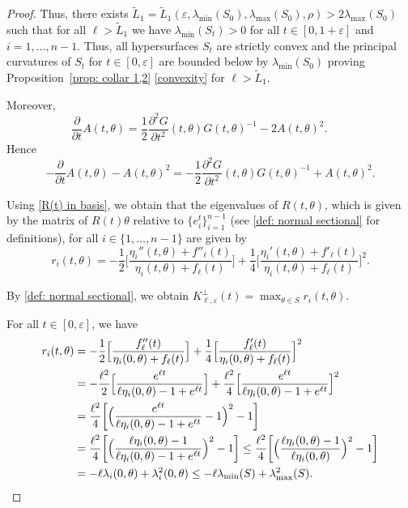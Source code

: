 \documentclass[10pt]{amsart}
\theoremstyle{definition}
\let\eps\varepsilon
\renewcommand{\>}{{\rangle}}
\newcommand{\<}{{\langle}}
\begin{document}
\begin{proof}
Thus, there exists $\tilde L_1=\tilde L_1(\eps, \lambda_{\min}(S_0), \lambda_{\max}(S_0), \rho)>2\lambda_{\max}(S_0)$ such that for all $\ell>\tilde L_1$ we have $\lambda_{\min}(S_t)>0$ for all $t\in[0,1+\eps]$ and $i=1,\ldots, n-1$. Thus, all hypersurfaces $S_t$ are strictly convex and the principal curvatures of $S_t$ for $t\in[0,\eps]$ are bounded below by $\lambda_{\min}(S_0)$ proving Proposition~\ref{prop: collar 1,2} \eqref{convexity} for $\ell> \tilde L_1$.

Moreover,
\[
\frac{\partial}{\partial t}A(t,\theta) = \frac{1}{2}\frac{\partial^2 G}{\partial t^2}(t,\theta)G(t,\theta)^{-1}-2A(t,\theta)^2. \qquad \text{}\nonumber
\]
Hence
\begin{equation}
-\frac{\partial}{\partial t}A(t,\theta)-A(t,\theta)^2 = -\frac{1}{2}\frac{\partial^2 G}{\partial t^2}(t,\theta)G(t,\theta)^{-1}+A(t,\theta)^2.\label{R(t) in basis}
\end{equation}

Using \eqref{R(t) in basis}, we obtain that the eigenvalues of $R(t,\theta)$, which is given by the matrix of $R(t)\theta$ relative to $\{e_i^t\}_{i=1}^{n-1}$ (see \eqref{def: normal sectional} for definitions), for all $i\in\{1,\ldots, n-1\}$ are given by
\begin{equation}\label{eigenvalues of R(t)}
r_i(t,\theta)=-\frac{1}{2}\biggl[\frac{\eta_i''(t,\theta)+f''_\ell(t)}{\eta_i(t,\theta)+f_\ell(t)}\biggr]+\frac{1}{4}\biggl[\frac{\eta_i'(t,\theta)+f'_\ell(t)}{\eta_i(t,\theta)+f_\ell(t)}\biggr]^2.
\end{equation}

By \eqref{def: normal sectional}, we obtain $K^\perp_{\ell,\eps}(t)=\max_{\theta\in S} r_i(t,\theta)$.

For all $t\in[0,\eps]$, we have
\begin{align*}
r_i(t,\theta) &= -\frac{1}{2}\Bigl[\frac{f''_\ell(t)}{\eta_i(0,\theta)+f_\ell(t)}\Bigr]+\frac{1}{4}\Bigl[\frac{f'_\ell(t)}{\eta_i(0,\theta)+f_\ell(t)}\Bigr]^2\\
&=-\frac{\ell^2}{2}\Bigl[\frac{e^{\ell t}}{\ell\eta_i(0,\theta)-1+e^{\ell t}}\Bigr]+\frac{\ell^2}{4}\Bigl[\frac{e^{\ell t}}{\ell\eta_i(0,\theta)-1+e^{\ell t}}\Bigr]^2\\
&=\frac{\ell^2}{4}\biggl[\Bigl(\frac{e^{\ell t}}{\ell\eta_i(0,\theta)-1+e^{\ell t}}-1\Bigr)^2-1\biggr]\\
&=\frac{\ell^2}{4}\biggl[\Bigl(\frac{\ell\eta_i(0,\theta)-1}{\ell\eta_i(0,\theta)-1+e^{\ell t}}\Bigr)^2-1\biggr]\leq \frac{\ell^2}{4}\biggl[\Bigl(\frac{\ell\eta_i(0,\theta)-1}{\ell\eta_i(0,\theta)}\Bigr)^2-1\biggr]\\
&= -\ell\lambda_i(0,\theta)+\lambda^2_i(0,\theta)\leq -\ell\lambda_{\min}(S)+\lambda^2_{\max}(S).
\end{align*}


\end{proof}
\end{document}
